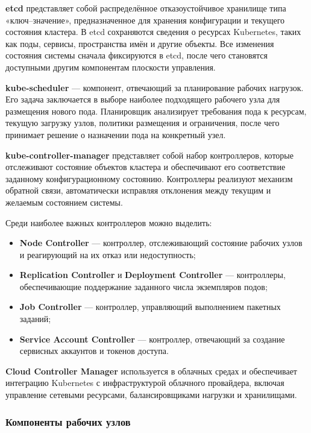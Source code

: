 \textbf{etcd} представляет собой распределённое отказоустойчивое хранилище типа «ключ–значение», предназначенное для хранения конфигурации и текущего состояния кластера. В etcd сохраняются сведения о ресурсах Kubernetes, таких как поды, сервисы, пространства имён и другие объекты. Все изменения состояния системы сначала фиксируются в etcd, после чего становятся доступными другим компонентам плоскости управления.

\textbf{kube-scheduler} — компонент, отвечающий за планирование рабочих нагрузок. Его задача заключается в выборе наиболее подходящего рабочего узла для размещения нового пода. Планировщик анализирует требования пода к ресурсам, текущую загрузку узлов, политики размещения и ограничения, после чего принимает решение о назначении пода на конкретный узел.

\textbf{kube-controller-manager} представляет собой набор контроллеров, которые отслеживают состояние объектов кластера и обеспечивают его соответствие заданному конфигурационному состоянию. Контроллеры реализуют механизм обратной связи, автоматически исправляя отклонения между текущим и желаемым состоянием системы.

Среди наиболее важных контроллеров можно выделить:

\begin{itemize}
    \item \textbf{Node Controller} — контроллер, отслеживающий состояние рабочих узлов и реагирующий на их отказ или недоступность;
    \item \textbf{Replication Controller} и \textbf{Deployment Controller} — контроллеры, обеспечивающие поддержание заданного числа экземпляров подов;
    \item \textbf{Job Controller} — контроллер, управляющий выполнением пакетных заданий;
    \item \textbf{Service Account Controller} — контроллер, отвечающий за создание сервисных аккаунтов и токенов доступа.
\end{itemize}

\textbf{Cloud Controller Manager} используется в облачных средах и обеспечивает интеграцию Kubernetes с инфраструктурой облачного провайдера, включая управление сетевыми ресурсами, балансировщиками нагрузки и хранилищами.

\subsubsection{Компоненты рабочих узлов}

